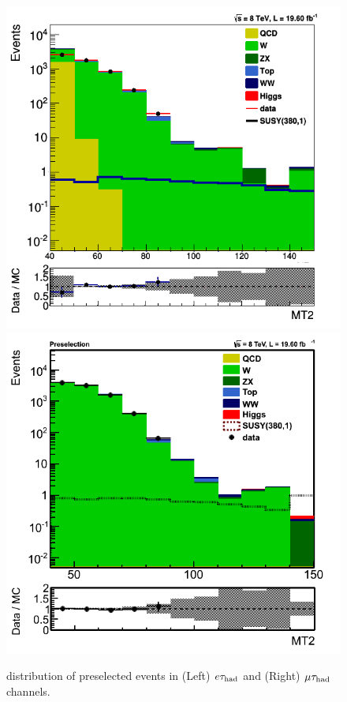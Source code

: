 \begin{figure}[htbp]
\centering
\includegraphics[angle=0,scale=0.35]{SelectionEleTau/MT2.png}
\includegraphics[angle=0,scale=0.35]{SelectionMuTau/MT2_muTau.png}
\caption{\mttwo distribution of preselected events in (Left) $e\tau_{\rm had}$ and (Right) $\mu\tau_{\rm had}$ channels.}
\label{fig:mt2leptontau}
\end{figure}


